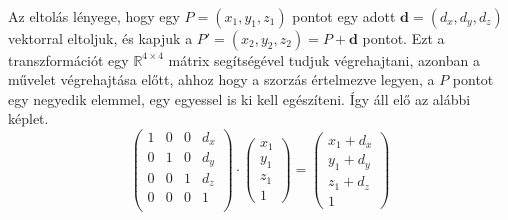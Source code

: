 \documentclass{elteikthesis}
\begin{document}
\paragraph{}
Az eltolás lényege, hogy egy $P = (x_1, y_1, z_1)$ pontot egy adott $\mathbf{d} = (d_x, d_y, d_z)$ vektorral eltoljuk, és kapjuk a $P' = (x_2, y_2, z_2) = P + \mathbf{d}$ pontot. Ezt a transzformációt egy $\mathbb{R}^{4\times4}$ mátrix segítségével tudjuk végrehajtani, azonban a művelet végrehajtása előtt, ahhoz hogy a szorzás értelmezve legyen, a $P$ pontot egy negyedik elemmel, egy egyessel is ki kell egészíteni. Így áll elő az alábbi képlet.
$$
\left( \begin{array}{cccc}
	1 & 0 & 0 & d_x \\
	0 & 1 & 0 & d_y \\
	0 & 0 & 1 & d_z \\
	0 & 0 & 0 & 1 \\
\end{array} \right)
\cdot
\left( \begin{array}{c}
	x_1 \\
	y_1 \\
	z_1 \\
	1 \end{array}
\right)
=
\left( \begin{array}{c}
	x_1 + d_x \\
	y_1 + d_y \\
	z_1 + d_z \\
	1 \end{array}
\right)
$$
\end{document}
